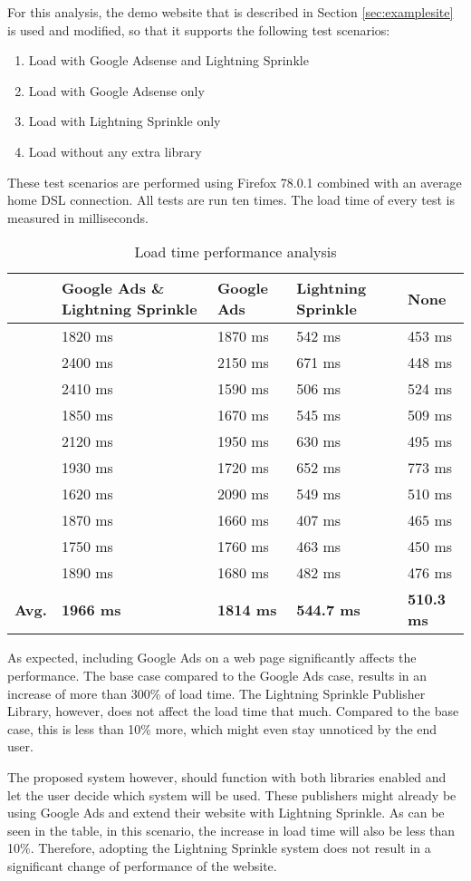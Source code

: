 For this analysis, the demo website that is described in Section \ref{sec:examplesite} is used and modified, so that it supports the following test scenarios:

\begin{enumerate}
  \item Load with Google Adsense and Lightning Sprinkle
  \item Load with Google Adsense only
  \item Load with Lightning Sprinkle only
  \item Load without any extra library
\end{enumerate}

\newpage
These test scenarios are performed using Firefox 78.0.1 combined with an average home DSL connection. All tests are run ten times. The load time of every test is measured in milliseconds.

\begin{table}[h!]
  \begin{tabular}{lllll}
  & Google Ads \& Lightning Sprinkle & Google Ads & Lightning Sprinkle & None \\
  \hline
  & 1820 ms & 1870 ms & 542 ms & 453 ms \\
  & 2400 ms & 2150 ms & 671 ms & 448 ms  \\
  & 2410 ms & 1590 ms & 506 ms & 524 ms  \\
  & 1850 ms & 1670 ms & 545 ms & 509 ms  \\
  & 2120 ms & 1950 ms & 630 ms & 495 ms  \\
  & 1930 ms & 1720 ms & 652 ms & 773 ms  \\
  & 1620 ms & 2090 ms & 549 ms & 510 ms  \\
  & 1870 ms & 1660 ms & 407 ms & 465 ms  \\
  & 1750 ms & 1760 ms & 463 ms & 450 ms  \\
  & 1890 ms & 1680 ms & 482 ms & 476 ms  \\
  \hline
  \textbf{Avg.} & \textbf{1966 ms} & \textbf{1814 ms} & \textbf{544.7 ms} & \textbf{510.3 ms}
  \end{tabular}
  \caption{Load time performance analysis}
\end{table}

As expected, including Google Ads on a web page significantly affects the performance. The base case compared to the Google Ads case, results in an increase of more than 300\% of load time. The Lightning Sprinkle Publisher Library, however, does not affect the load time that much. Compared to the base case, this is less than 10\% more, which might even stay unnoticed by the end user. 

The proposed system however, should function with both libraries enabled and let the user decide which system will be used. These publishers might already be using Google Ads and extend their website with Lightning Sprinkle. As can be seen in the table, in this scenario, the increase in load time will also be less than 10\%. Therefore, adopting the Lightning Sprinkle system does not result in a significant change of performance of the website.